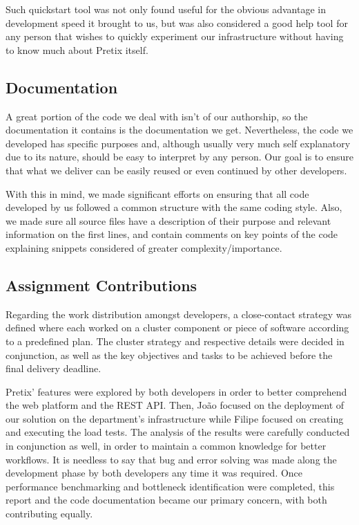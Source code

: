 \documentclass[12pt]{article}
\begin{document}
Such quickstart tool was not only found useful for the obvious advantage in development speed it brought to us, but was also considered a good help tool for any
person that wishes to quickly experiment our infrastructure without having to know much about Pretix itself.

\subsection{Documentation} \label{remarks.documentation} %


A great portion of the code we deal with isn't of our authorship, so the documentation it contains is the documentation we get.
Nevertheless, the code we developed has specific purposes and, although usually very much self explanatory due to its nature, should be easy to interpret by any person.
Our goal is to ensure that what we deliver can be easily reused or even continued by other developers.

With this in mind, we made significant efforts on ensuring that all code developed by us followed a common structure with the same coding style.
Also, we made sure all source files have a description of their purpose and relevant information on the first lines, and contain comments on key points of the
code explaining snippets considered of greater complexity/importance.

\subsection{Assignment Contributions} \label{remarks.contributions} %


Regarding the work distribution amongst developers, a close-contact strategy was defined where each worked on a cluster component or piece of software according
to a predefined plan.
The cluster strategy and respective details were decided in conjunction, as well as the key objectives and tasks to be achieved before the final delivery deadline.

Pretix' features were explored by both developers in order to better comprehend the web platform and the REST API.
Then, João focused on the deployment of our solution on the department's infrastructure while Filipe focused on creating and executing the load tests.
The analysis of the results were carefully conducted in conjunction as well, in order to maintain a common knowledge for better workflows.
It is needless to say that bug and error solving was made along the development phase by both developers any time it was required.
Once performance benchmarking and bottleneck identification were completed, this report and the code documentation became our primary concern, with both
contributing equally.
\end{document}
